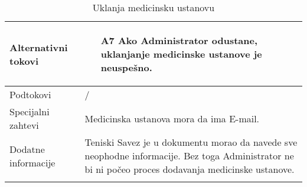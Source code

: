 \documentclass{article}
\begin{document}
\begin{longtable}{| p{} | p{} |}
            \hline
                Alternativni tokovi & 
                \begin{itemize}
                    \item[A7] Ako Administrator odustane, uklanjanje medicinske ustanove je neuspešno.
                \end{itemize} \\
            \hline
                Podtokovi & /\\
            \hline
                Specijalni zahtevi &  Medicinska ustanova mora da ima E-mail.\\
            \hline
                Dodatne informacije & Teniski Savez je u dokumentu morao da navede sve neophodne informacije. Bez toga Administrator ne bi ni počeo proces dodavanja medicinske ustanove.\\
            \hline
            \caption{Uklanja medicinsku ustanovu}
        \end{longtable}
        
\end{document}
